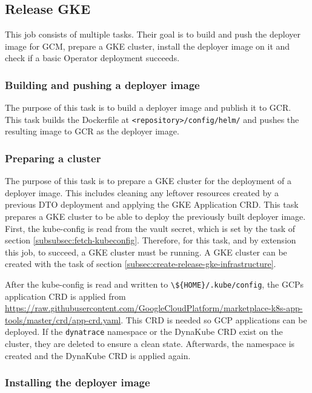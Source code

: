 \subsection{Release GKE}\label{subsec:release-gke}

This job consists of multiple tasks.
Their goal is to build and push the deployer image for GCM, prepare a GKE cluster, install the deployer image on it and check if a basic Operator deployment succeeds.

\subsubsection{Building and pushing a deployer image}\label{subsubsec:build-and-publish-deployer-image}

The purpose of this task is to build a deployer image and publish it to GCR.
This task builds the Dockerfile at \verb|<repository>/config/helm/| and pushes the resulting image to GCR as the deployer image.

\subsubsection{Preparing a cluster}\label{subsubsec:prepare-cluster}

The purpose of this task is to prepare a GKE cluster for the deployment of a deployer image.
This includes cleaning any leftover resources created by a previous DTO deployment and applying the GKE Application CRD.
This task prepares a GKE cluster to be able to deploy the previously built deployer image.
First, the kube-config is read from the vault secret, which is set by the task of section \ref{subsubsec:fetch-kubeconfig}.
Therefore, for this task, and by extension this job, to succeed, a GKE cluster must be running.
A GKE cluster can be created with the task of section \ref{subsec:create-release-gke-infrastructure}.

After the kube-config is read and written to \verb|\${HOME}/.kube/config|, the GCPs application CRD is applied from \url{https://raw.githubusercontent.com/GoogleCloudPlatform/marketplace-k8s-app-tools/master/crd/app-crd.yaml}.
This CRD is needed so GCP applications can be deployed.
If the \verb|dynatrace| namespace or the DynaKube CRD exist on the cluster, they are deleted to ensure a clean state.
Afterwards, the namespace is created and the DynaKube CRD is applied again.

\subsubsection{Installing the deployer image}\label{subsubsec:install-deployer-image}

